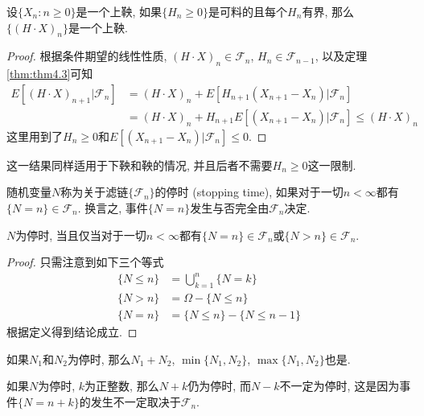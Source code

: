 \documentclass[cn, 12pt, math=mtpro2, bibstyle=apa, blue, twocol]{elegantbook}
\newcommand{\F}{\mathcal{F}}
\begin{document}
\begin{theorem}\label{thm:thm4.6}
  设$\{X_n:n\ge0\}$是一个上鞅, 如果$\{H_n\ge0\}$是可料的且每个$H_n$有界, 那么$\{(H\cdot X)_n\}$是一个上鞅.
\end{theorem}
\begin{proof}
  根据条件期望的线性性质, $(H\cdot X)_n\in\F_n$, $H_{n}\in\F_{n-1}$, 以及定理\ref{thm:thm4.3}可知
  \begin{align*}
  E[(H\cdot X)_{n+1}|\F_n]&=(H\cdot X)_n+E[H_{n+1}(X_{n+1}-X_n)|\F_n] \\
  &=(H\cdot X)_n+H_{n+1}E[(X_{n+1}-X_n)|\F_n]\leq (H\cdot X)_n
  \end{align*}
  这里用到了$H_n\ge0$和$E[(X_{n+1}-X_n)|\F_n]\le0$.
\end{proof}
\begin{remark}
这一结果同样适用于下鞅和鞅的情况, 并且后者不需要$H_n\ge0$这一限制.
\end{remark}
\begin{definition}
随机变量$N$称为关于滤链$\{\F_n\}$的停时 (stopping time), 如果对于一切$n<\infty$都有$\{N=n\}\in\F_n$. 换言之, 事件$\{N=n\}$发生与否完全由$\F_n$决定.
\end{definition}

\begin{theorem}
  $N$为停时, 当且仅当对于一切$n<\infty$都有$\{N=n\}\in\F_n$或$\{N>n\}\in\F_n$.
\end{theorem}
\begin{proof}
  只需注意到如下三个等式
  \begin{align*}
  \{N\leq n\}&=\textstyle\bigcup_{k=1}^n\{N=k\} \\
  \{N>n\}&=\Omega-\{N\leq n\} \\
  \{N=n\}&=\{N\leq n\}-\{N\leq n-1\}
  \end{align*}
  根据定义得到结论成立.
\end{proof}
\begin{corollary}
如果$N_1$和$N_2$为停时, 那么$N_1+N_2$, $\min\{N_1,N_2\}$, $\max\{N_1,N_2\}$也是.
\end{corollary}

\begin{remark}
如果$N$为停时, $k$为正整数, 那么$N+k$仍为停时, 而$N-k$不一定为停时, 这是因为事件$\{N=n+k\}$的发生不一定取决于$\F_n$.
\end{remark}
\end{document}
